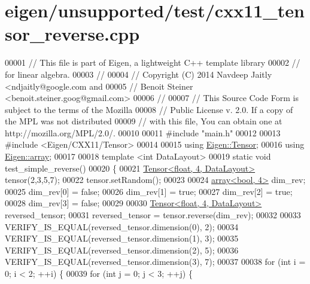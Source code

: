\hypertarget{eigen_2unsupported_2test_2cxx11__tensor__reverse_8cpp_source}{}\section{eigen/unsupported/test/cxx11\+\_\+tensor\+\_\+reverse.cpp}
\label{eigen_2unsupported_2test_2cxx11__tensor__reverse_8cpp_source}

\begin{DoxyCode}
00001 \textcolor{comment}{// This file is part of Eigen, a lightweight C++ template library}
00002 \textcolor{comment}{// for linear algebra.}
00003 \textcolor{comment}{//}
00004 \textcolor{comment}{// Copyright (C) 2014 Navdeep Jaitly <ndjaitly@google.com and}
00005 \textcolor{comment}{//                    Benoit Steiner <benoit.steiner.goog@gmail.com>}
00006 \textcolor{comment}{//}
00007 \textcolor{comment}{// This Source Code Form is subject to the terms of the Mozilla}
00008 \textcolor{comment}{// Public License v. 2.0. If a copy of the MPL was not distributed}
00009 \textcolor{comment}{// with this file, You can obtain one at http://mozilla.org/MPL/2.0/.}
00010 
00011 \textcolor{preprocessor}{#include "main.h"}
00012 
00013 \textcolor{preprocessor}{#include <Eigen/CXX11/Tensor>}
00014 
00015 \textcolor{keyword}{using} \hyperlink{class_eigen_1_1_tensor}{Eigen::Tensor};
00016 \textcolor{keyword}{using} \hyperlink{class_eigen_1_1array}{Eigen::array};
00017 
00018 \textcolor{keyword}{template} <\textcolor{keywordtype}{int} DataLayout>
00019 \textcolor{keyword}{static} \textcolor{keywordtype}{void} test\_simple\_reverse()
00020 \{
00021   \hyperlink{class_eigen_1_1_tensor}{Tensor<float, 4, DataLayout>} tensor(2,3,5,7);
00022   tensor.setRandom();
00023 
00024   \hyperlink{class_eigen_1_1array}{array<bool, 4>} dim\_rev;
00025   dim\_rev[0] = \textcolor{keyword}{false};
00026   dim\_rev[1] = \textcolor{keyword}{true};
00027   dim\_rev[2] = \textcolor{keyword}{true};
00028   dim\_rev[3] = \textcolor{keyword}{false};
00029 
00030   \hyperlink{class_eigen_1_1_tensor}{Tensor<float, 4, DataLayout>} reversed\_tensor;
00031   reversed\_tensor = tensor.reverse(dim\_rev);
00032 
00033   VERIFY\_IS\_EQUAL(reversed\_tensor.dimension(0), 2);
00034   VERIFY\_IS\_EQUAL(reversed\_tensor.dimension(1), 3);
00035   VERIFY\_IS\_EQUAL(reversed\_tensor.dimension(2), 5);
00036   VERIFY\_IS\_EQUAL(reversed\_tensor.dimension(3), 7);
00037 
00038   \textcolor{keywordflow}{for} (\textcolor{keywordtype}{int} i = 0; i < 2; ++i) \{
00039     \textcolor{keywordflow}{for} (\textcolor{keywordtype}{int} j = 0; j < 3; ++j) \{

\end{DoxyCode}
